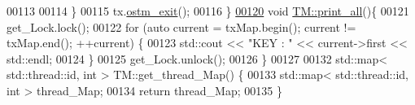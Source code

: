 \begin{DoxyCode}
00113 
00114     \}
00115     tx.\hyperlink{class_t_x_aa9739c5c2077454c779098db7baefc2b}{ostm\_exit}();
00116 \}
\hypertarget{_t_m_8cpp_source.tex_l00120}{}\hyperlink{class_t_m_a1d6891b1d3e71cc0acef54e7afe71c09}{00120} \textcolor{keywordtype}{void} \hyperlink{class_t_m_a1d6891b1d3e71cc0acef54e7afe71c09}{TM::print\_all}()\{
00121     get\_Lock.lock();
00122     \textcolor{keywordflow}{for} (\textcolor{keyword}{auto} current = txMap.begin(); current != txMap.end(); ++current) \{
00123         std::cout << \textcolor{stringliteral}{"KEY : "} << current->first << std::endl;
00124     \}
00125     get\_Lock.unlock();
00126 \}
00127 
00132 std::map< std::thread::id, int > TM::get\_thread\_Map() \{
00133     std::map< std::thread::id, int > thread\_Map;
00134     \textcolor{keywordflow}{return} thread\_Map;
00135 \}
\end{DoxyCode}

